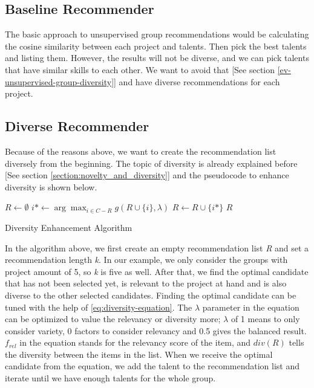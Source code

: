 \subsection{Baseline Recommender}

The basic approach to unsupervised group recommendations would be calculating the cosine similarity between each project and talents. Then pick the best talents and listing them. However, the results will not be diverse, and we can pick talents that have similar skills to each other. We want to avoid that [See section \ref{ev-unsupervised-group-diversity}] and have diverse recommendations for each project.


\subsection{Diverse Recommender}\label{implementation-diverse}

Because of the reasons above, we want to create the recommendation list diversely from the beginning. The topic of diversity is already explained before [See section \ref{section:novelty_and_diversity}] and the pseudocode to enhance diversity is shown below.

\begin{algorithm}
	\begin{algorithmic}
		\STATE $R\gets \emptyset$
		\STATE $i*\gets \arg \max _ { i \in C - R } g ( R \cup \{ i \} , \lambda )$
		\STATE $R\gets  R \cup \{ i * \} $
		\ENDWHILE
		\RETURN $R$
		\label{eq:diversity-enhancement}
	\end{algorithmic}
	\caption{Diversity Enhancement Algorithm}
\end{algorithm}


In the algorithm above, we first create an empty recommendation list \textit{R} and set a recommendation length \textit{k}. In our example, we only consider the groups with project amount of 5, so \textit{k} is five as well. After that, we find the optimal candidate that has not been selected yet, is relevant to the project at hand and is also diverse to the other selected candidates. Finding the optimal candidate can be tuned with the help of \eqref{eq:diversity-equation}. The $\lambda$ parameter in the equation can be optimized to value the relevancy or diversity more; $\lambda$ of 1 means to only consider variety, 0 factors to consider relevancy and 0.5 gives the balanced result. $f _ { r e l }$ in the equation stands for the relevancy score of the item, and $d i v ( R )$ tells the diversity between the items in the list. When we receive the optimal candidate from the equation, we add the talent to the recommendation list and iterate until we have enough talents for the whole group.

